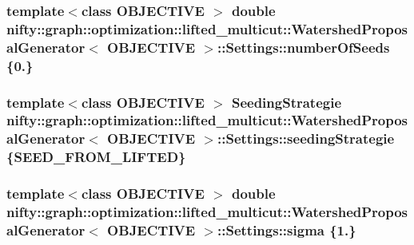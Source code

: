 \subsubsection[{number\+Of\+Seeds}]{\setlength{\rightskip}{0pt plus 5cm}template$<$class O\+B\+J\+E\+C\+T\+I\+V\+E $>$ double {\bf nifty\+::graph\+::optimization\+::lifted\+\_\+multicut\+::\+Watershed\+Proposal\+Generator}$<$ O\+B\+J\+E\+C\+T\+I\+V\+E $>$\+::Settings\+::number\+Of\+Seeds \{0.\}}\label{structnifty_1_1graph_1_1optimization_1_1lifted__multicut_1_1WatershedProposalGenerator_1_1Settings_ac7767632318ea658927b4e1cc590db76}
\hypertarget{structnifty_1_1graph_1_1optimization_1_1lifted__multicut_1_1WatershedProposalGenerator_1_1Settings_ac744dd1746866a6348752d2611380d50}{}
\subsubsection[{seeding\+Strategie}]{\setlength{\rightskip}{0pt plus 5cm}template$<$class O\+B\+J\+E\+C\+T\+I\+V\+E $>$ {\bf Seeding\+Strategie} {\bf nifty\+::graph\+::optimization\+::lifted\+\_\+multicut\+::\+Watershed\+Proposal\+Generator}$<$ O\+B\+J\+E\+C\+T\+I\+V\+E $>$\+::Settings\+::seeding\+Strategie \{{\bf S\+E\+E\+D\+\_\+\+F\+R\+O\+M\+\_\+\+L\+I\+F\+T\+E\+D}\}}\label{structnifty_1_1graph_1_1optimization_1_1lifted__multicut_1_1WatershedProposalGenerator_1_1Settings_ac744dd1746866a6348752d2611380d50}
\hypertarget{structnifty_1_1graph_1_1optimization_1_1lifted__multicut_1_1WatershedProposalGenerator_1_1Settings_ade46be30b6dd866c2777242343077d3a}{}
\subsubsection[{sigma}]{\setlength{\rightskip}{0pt plus 5cm}template$<$class O\+B\+J\+E\+C\+T\+I\+V\+E $>$ double {\bf nifty\+::graph\+::optimization\+::lifted\+\_\+multicut\+::\+Watershed\+Proposal\+Generator}$<$ O\+B\+J\+E\+C\+T\+I\+V\+E $>$\+::Settings\+::sigma \{1.\}}\label{structnifty_1_1graph_1_1optimization_1_1lifted__multicut_1_1WatershedProposalGenerator_1_1Settings_ade46be30b6dd866c2777242343077d3a}


